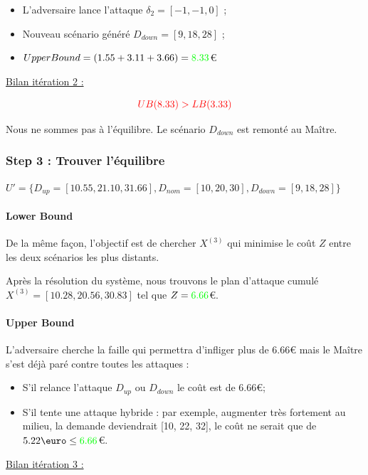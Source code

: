 \documentclass[11pt,a4paper]{article}
\begin{document}
\begin{itemize}
    \item L'adversaire lance l'attaque $\delta_2=[-1, -1, 0]$ ;
    \item Nouveau scénario généré $D_{down}=[9, 18, 28]$ ;
    \item $UpperBound=(1.55+3.11+3.66)=\textcolor{green}{8.33}$\euro
\end{itemize}

\underline{Bilan itération 2 :}

\[
    \textcolor{red}{UB(8.33)>LB(3.33)}
\]

Nous ne sommes pas à l'équilibre. Le scénario $D_{down}$ est remonté au Maître.


\subsubsection{Step 3 : Trouver l'équilibre}

\textit{$U'=\{D_{up}=[10.55, 21.10, 31.66], D_{nom}=[10, 20, 30], D_{down}=[9, 18, 28]\}$}

\paragraph{Lower Bound} De la même façon, l'objectif est de chercher $X^{(3)}$ qui minimise le coût $Z$ entre les deux scénarios les plus distants.

Après la résolution du système, nous trouvons le plan d'attaque cumulé $X^{(3)}=[10.28, 20.56, 30.83]$ tel que $Z=\textcolor{green}{6.66}$\euro.

\paragraph{Upper Bound} L'adversaire cherche la faille qui permettra d'infliger plus de $6.66$\euro{} mais le Maître s'est déjà paré contre toutes les attaques :

\begin{itemize}
    \item S'il relance l'attaque $D_{up}$ ou $D_{down}$ le coût est de $6.66$\euro ;
    \item S'il tente une attaque hybride : par exemple, augmenter très fortement au milieu, la demande deviendrait [10, 22, 32], le coût ne serait que de $5.22\text{\euro}\leq \textcolor{green}{6.66}$\euro.
\end{itemize}

\underline{Bilan itération 3 :}
\end{document}
